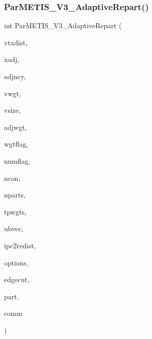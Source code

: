 \subsubsection{\texorpdfstring{Par\+M\+E\+T\+I\+S\+\_\+\+V3\+\_\+\+Adaptive\+Repart()}{ParMETIS\_V3\_AdaptiveRepart()}}
{\footnotesize\ttfamily int Par\+M\+E\+T\+I\+S\+\_\+\+V3\+\_\+\+Adaptive\+Repart (\begin{DoxyParamCaption}\item[{\hyperlink{a00876_aaa5262be3e700770163401acb0150f52}{idx\+\_\+t} $\ast$}]{vtxdist,  }\item[{\hyperlink{a00876_aaa5262be3e700770163401acb0150f52}{idx\+\_\+t} $\ast$}]{xadj,  }\item[{\hyperlink{a00876_aaa5262be3e700770163401acb0150f52}{idx\+\_\+t} $\ast$}]{adjncy,  }\item[{\hyperlink{a00876_aaa5262be3e700770163401acb0150f52}{idx\+\_\+t} $\ast$}]{vwgt,  }\item[{\hyperlink{a00876_aaa5262be3e700770163401acb0150f52}{idx\+\_\+t} $\ast$}]{vsize,  }\item[{\hyperlink{a00876_aaa5262be3e700770163401acb0150f52}{idx\+\_\+t} $\ast$}]{adjwgt,  }\item[{\hyperlink{a00876_aaa5262be3e700770163401acb0150f52}{idx\+\_\+t} $\ast$}]{wgtflag,  }\item[{\hyperlink{a00876_aaa5262be3e700770163401acb0150f52}{idx\+\_\+t} $\ast$}]{numflag,  }\item[{\hyperlink{a00876_aaa5262be3e700770163401acb0150f52}{idx\+\_\+t} $\ast$}]{ncon,  }\item[{\hyperlink{a00876_aaa5262be3e700770163401acb0150f52}{idx\+\_\+t} $\ast$}]{nparts,  }\item[{\hyperlink{a00876_a1924a4f6907cc3833213aba1f07fcbe9}{real\+\_\+t} $\ast$}]{tpwgts,  }\item[{\hyperlink{a00876_a1924a4f6907cc3833213aba1f07fcbe9}{real\+\_\+t} $\ast$}]{ubvec,  }\item[{\hyperlink{a00876_a1924a4f6907cc3833213aba1f07fcbe9}{real\+\_\+t} $\ast$}]{ipc2redist,  }\item[{\hyperlink{a00876_aaa5262be3e700770163401acb0150f52}{idx\+\_\+t} $\ast$}]{options,  }\item[{\hyperlink{a00876_aaa5262be3e700770163401acb0150f52}{idx\+\_\+t} $\ast$}]{edgecut,  }\item[{\hyperlink{a00876_aaa5262be3e700770163401acb0150f52}{idx\+\_\+t} $\ast$}]{part,  }\item[{M\+P\+I\+\_\+\+Comm $\ast$}]{comm }\end{DoxyParamCaption})}

